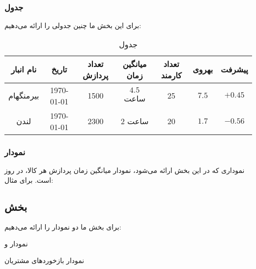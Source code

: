 \documentclass[11pt, oneside]{book}
\begin{document}
\subsubsection{جدول}
برای این بخش ما چنین جدولی را ارائه می‌دهیم:
\begin{table}[H]
\begin{center}
\caption{جدول }
\begin{adjustbox}{width=\textwidth}
\begin{tabular}{|c|c|c|c|c|c|c|}
\hline
نام انبار &
تاریخ &
تعداد پردازش &
میانگین زمان &
تعداد کارمند &
بهروی &
پیشرفت \\
\hline
\hline
بیرمنگهام &
\today &
1500 &
$4.5$ ساعت &
25 &
$7.5$ &
$+0.45$ \\
\hline
لندن &
\today &
2300 &
2 ساعت &
20 &
$1.7$ &
$-0.56$ \\
\hline
\end{tabular}
\end{adjustbox}
\end{center}
\end{table}

\newpage
\subsubsection{نمودار}
نموداری که در این بخش ارائه می‌شود، نمودار میانگین زمان پردازش هر کالا، در روز است. برای مثال:
\begin{latin}
\begin{center}
\end{center}
\end{latin}

\subsection{بخش }\label{ssec:site}
برای بخش 
ما دو نمودار را ارائه می‌دهیم: 
\begin{enumerate*}
\item 
نمودار 
و
\item 
نمودار بازخورد‌های مشتریان
\end{enumerate*}
\end{document}
